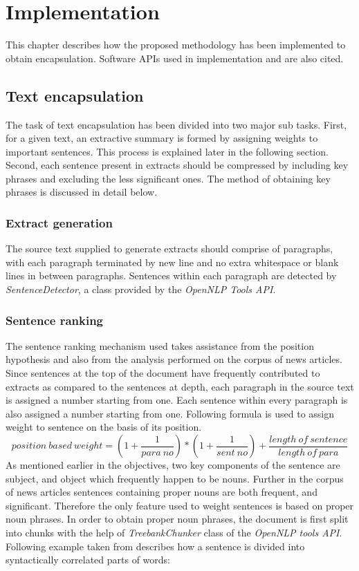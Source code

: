 \chapter{Implementation}
This chapter describes how the proposed methodology has been implemented to obtain encapsulation. Software APIs used in implementation and are also cited.
\section{Text encapsulation}
The task of text encapsulation has been divided into two major sub tasks. First, for a given text, an extractive summary is formed by assigning weights to important 
sentences. This process is explained later in the following section. Second, each sentence present in extracts should be compressed by including key phrases and
excluding the less significant ones. The method of obtaining key phrases is discussed in detail below.
\subsection{Extract generation}
The source text supplied to generate extracts should comprise of paragraphs, with each paragraph terminated by new line and no extra whitespace or blank lines in between
paragraphs. Sentences within each paragraph are detected by \emph{SentenceDetector}, a class provided by the \emph{OpenNLP Tools API}. 
\subsection{Sentence ranking}
The sentence ranking mechanism used takes assistance from the position hypothesis and also from the analysis performed on the corpus of news articles. Since sentences 
at the top of the document have frequently contributed to extracts as compared to the sentences at depth, each paragraph in the source text is assigned a 
number starting from one. Each sentence within every paragraph is also assigned a number starting from one. Following formula is used to assign weight to sentence on 
the basis of its position. 
\begin{displaymath}
  position\ based\ weight = (1 + \frac{1}{para\ no}) * (1 + \frac{1}{sent\ no}) + \frac{length\ of\ sentence}{length\ of\ para} 
\end{displaymath}
As mentioned earlier in the objectives, two key components of the sentence are subject, and object which frequently happen to be nouns. Further in the corpus of
news articles sentences containing proper nouns are both frequent, and significant. Therefore the only feature used to weight sentences is based on 
proper noun phrases. In order to obtain proper noun phrases, the document is first split into chunks with the help of \emph{TreebankChunker} class of the 
\emph{OpenNLP tools API}. Following example taken from  describes how a sentence is divided into syntactically correlated parts of words:


